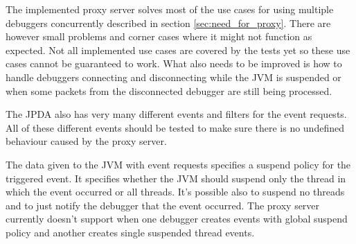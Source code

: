\documentclass[..thesis.tex]{subfiles}
\begin{document}
The implemented proxy server solves most of the use cases for using multiple debuggers concurrently described in section \ref{sec:need_for_proxy}.
There are however small problems and corner cases where it might not function as expected.
Not all implemented use cases are covered by the tests yet so these use cases cannot be guaranteed to work.
What also needs to be improved is how to handle debuggers connecting and disconnecting while the JVM is suspended or when some packets from the disconnected debugger are still being processed.

The JPDA also has very many different events and filters for the event requests.
All of these different events should be tested to make sure there is no undefined behaviour caused by the proxy server.

The data given to the JVM with event requests specifies a suspend policy for the triggered event.
It specifies whether the JVM should suspend only the thread in which the event occurred or all threads.
It's possible also to suspend no threads and to just notify the debugger that the event occurred.
The proxy server currently doesn't support when one debugger creates events with global suspend policy and another creates single suspended thread events.
\end{document}

